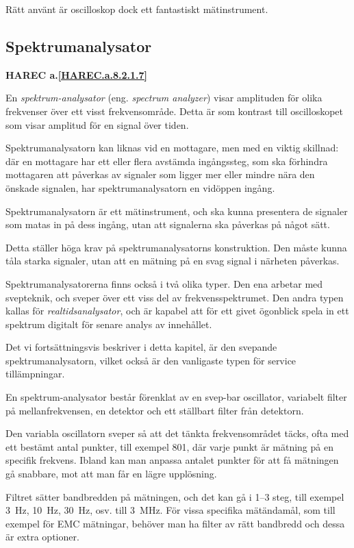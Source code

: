 Rätt använt är oscilloskop dock ett fantastiskt mätinstrument.

\subsection{Spektrumanalysator}
\textbf{
HAREC a.\ref{HAREC.a.8.2.1.7}\label{myHAREC.a.8.2.1.7}
}
\label{spektrumanalysator}

En \emph{spektrum-analysator} (eng. \emph{spectrum analyzer}) visar amplituden
för olika frekvenser över ett visst frekvensområde.
Detta är som kontrast till oscilloskopet som visar amplitud för en signal
över tiden.

Spektrumanalysatorn kan liknas vid en mottagare, men med en viktig skillnad:
där en mottagare har ett eller flera avstämda ingångssteg, som ska förhindra
mottagaren att påverkas av signaler som ligger mer eller mindre nära den
önskade signalen, har spektrumanalysatorn en vidöppen ingång.

Spektrumanalysatorn är ett mätinstrument, och ska kunna presentera de
signaler som matas in på dess ingång, utan att signalerna ska påverkas på
något sätt.

Detta ställer höga krav på spektrumanalysatorns konstruktion.
Den måste kunna tåla starka signaler, utan att en mätning på en svag signal i
närheten påverkas.

Spektrumanalysatorerna finns också i två olika typer.
Den ena arbetar med svepteknik, och sveper över ett viss del av
frekvensspektrumet.
Den andra typen kallas för \emph{realtidsanalysator}, och är kapabel att för
ett givet ögonblick spela in ett spektrum digitalt för senare analys av
innehållet.

Det vi fortsättningsvis beskriver i detta kapitel, är den svepande
spektrumanalysatorn, vilket också är den vanligaste typen för
service tillämpningar.

En spektrum-analysator består förenklat av en svep-bar oscillator,
variabelt filter på mellanfrekvensen, en detektor och ett ställbart
filter från detektorn.

Den variabla oscillatorn sveper så att det tänkta frekvensområdet täcks, ofta
med ett bestämt antal punkter, till exempel 801, där varje punkt är mätning på
en specifik frekvens.
Ibland kan man anpassa antalet punkter för att få mätningen gå snabbare,
mot att man får en lägre upplösning.

Filtret sätter bandbredden på mätningen, och det kan gå i 1--3 steg, till exempel
3~Hz, 10~Hz, 30~Hz, osv. till 3~MHz.
För vissa specifika mätändamål, som till exempel för EMC mätningar, behöver man
ha filter av rätt bandbredd och dessa är extra optioner.

